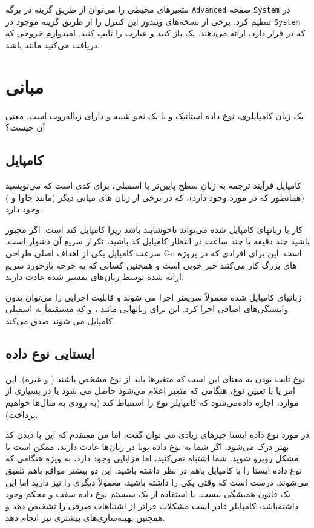 \documentclass{book}
\begin{document}
متغیرهای محیطی را می‌توان از طریق گزینه  در برگه \verb*|Advanced| صفحه \verb*|System| در تنظیم کرد. برخی از نسخه‌های ویندوز این کنترل را از طریق گزینه   موجود در \verb*|System| که در  قرار دارد، ارائه می‌دهند.
یک  باز کنید و عبارت  را تایپ کنید. امیدوارم خروجی که دریافت می‌کنید مانند  باشد.


\chapter{ مبانی }
 یک زبان کامپایلری، نوع  داده استاتیک و با یک نحو شبیه  و دارای زباله‌روب است. معنی آن چیست؟
\newpage
\section{کامپایل}
کامپایل فرآیند ترجمه به زبان سطح پایین‌تر یا اسمبلی، برای کدی است که می‌نویسید (همانطور که در مورد  وجود دارد)، که در برخی از زبان های میانی دیگر (مانند جاوا و ) وجود دارد.

کار با زبانهای کامپایل شده می‌تواند ناخوشایند باشد زیرا کامپایل کند است. اگر مجبور باشید چند دقیقه یا چند ساعت در انتظار کامپایل کد باشید، تکرار سریع آن دشوار است. سرعت کامپایل یکی از اهداف اصلی طراحی Go است. این برای افرادی که در پروژه های بزرگ کار می‌کنند  خبر خوبی است و همچنین کسانی که به چرخه بازخورد سریع ارائه شده توسط زبان‌های تفسیر شده عادت دارند.

زبانهای کامپایل شده معمولاً سریعتر اجرا می شوند و قابلیت اجرایی را می‌توان بدون وابستگی‌های اضافی اجرا کرد. این برای زبانهایی مانند ،  و  که مستقیماً به اسمبلی کامپایل می شوند صدق می‌کند.
\newpage
\section{ایستایی نوع داده}
نوع ثابت بودن به معنای این است که متغیرها باید از نوع مشخص باشند ( و غیره). این امر یا با تعیین نوع، هنگامی که متغیر اعلام می‌شود حاصل می شود یا در بسیاری از موارد، اجازه داده‌می‌شود که کامپایلر نوع را استنباط کند (به زودی به مثال‌ها خواهیم پرداخت).

در مورد  نوع داده ایستا چیزهای زیادی می توان گفت، اما من معتقدم که این با دیدن کد بهتر درک می‌شود. اگر شما به نوع داده پویا در زبان‌ها عادت دارید، ممکن است با مشکل روبرو شوید. شما اشتباه نمی‌کنید، اما مزایایی وجود دارد، به ویژه هنگامی که نوع داده ایستا را  با کامپایل باهم در نظر داشته باشید. این دو بیشتر مواقع باهم تلفیق می‌شوند. درست است که وقتی یکی را داشته باشید، معمولاً دیگری را نیز دارید اما این یک قانون همیشگی نیست. با استفاده از یک سیستم نوع  داده سفت و محکم وجود داشته‌باشد، کامپایلر قادر است مشکلات فراتر از اشتباهات صرفی را تشخیص دهد و همچنین بهینه‌سازی‌های بیشتری نیز انجام دهد.
\newpage
\end{document}
